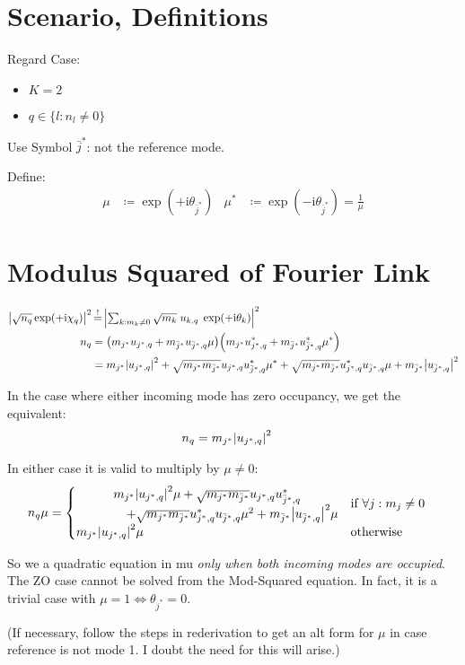 \documentclass[
	english,
	a4paper,
	fontsize=10pt,
	parskip=half,
	titlepage=true,
	DIV=12,
	final
]{scrreprt}
\newcommand*{\iunit}{\ensuremath{\mathrm{i}}}
\newcommand*{\equalCond}{  \mathop{=}\limits^!  }
\begin{document}
\section{Scenario, Definitions}
Regard Case:
\begin{itemize}
\item $K = 2$
\item $q \in \{l : n_l \neq 0\}$
\end{itemize}

Use Symbol $\bar{j}^*$: not the reference mode.

Define:
\begin{align}
	\mu
&\coloneqq
	\exp(+\iunit \theta_{\bar{j}^*})
&
	\mu^*
&\coloneqq
	\exp(-\iunit \theta_{\bar{j}^*})
=
	\frac{1}{\mu}
\end{align}

\section{Modulus Squared of Fourier Link}
\begin{align}
	\abs{
		\sqrt{n_q} \exp(+\iunit \chi_q)
	}^2
&\equalCond
	\abs{
		\textstyle \sum_{k : m_k \neq 0}
			\sqrt{m_k} \; u_{k,q} \; \exp(+\iunit\theta_k)
	}^2
\\
	n_q
&=
	\qty(
		m_{     j ^*} u_{     j ^*, q} +
		m_{\bar{j}^*} u_{\bar{j}^*, q} \mu
	)	
	\qty(
		m_{     j ^*} u_{     j ^*, q}^* +
		m_{\bar{j}^*} u_{\bar{j}^*, q}^* \mu^*
	) \\
&=
	  m_{j^*} \abs{u_{j^*, q}}^2
	+ \sqrt{m_{j^*} m_{\bar{j}^*}} u_{j^*, q}   u_{\bar{j}^*, q}^* \mu^*
	+ \sqrt{m_{j^*} m_{\bar{j}^*}} u_{j^*, q}^* u_{\bar{j}^*, q}   \mu
	+ m_{\bar{j}^*} \abs{u_{\bar{j}^*, q}}^2
\end{align}

In the case where either incoming mode has zero occupancy, we get the equivalent:
\begin{align}
	n_q
&=
	m_{j^*} \abs{u_{j^*, q}}^2
\end{align}

In either case it is valid to multiply by $\mu \neq 0$:
\begin{align}
	n_q \mu
&=
	\begin{cases}
		\mqty{
			  m_{j^*} \abs{u_{j^*, q}}^2 \mu
			+ \sqrt{m_{j^*} m_{\bar{j}^*}} u_{j^*, q}   u_{\bar{j}^*, q}^*
			\\
			\qquad\qquad
			+ \sqrt{m_{j^*} m_{\bar{j}^*}} u_{j^*, q}^* u_{\bar{j}^*, q}   \mu^2
			+ m_{\bar{j}^*} \abs{u_{\bar{j}^*, q}}^2                       \mu
		}
		&
		\text{if } \forall j : m_j \neq 0
	\\
		m_{j^*} \abs{u_{j^*, q}}^2 \mu
		&
		\text{otherwise}
	\end{cases}
\end{align}

So we a quadratic equation in mu \emph{only when both incoming modes are occupied}. The ZO case cannot be solved from the Mod-Squared equation. In fact, it is a trivial case with $\mu = 1 \Leftrightarrow \theta_{j^*} = 0$.

{\color{blue} (If necessary, follow the steps in rederivation to get an alt form for $\mu$ in case reference is not mode 1. I doubt the need for this will arise.)}
\end{document}
